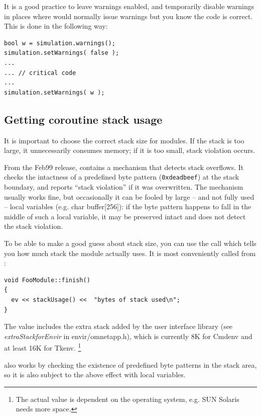 It is a good practice to leave warnings enabled, and
temporarily disable warnings in places where {\opp} would normally
issue warnings but you know the code is correct. This is done in the
following way:

\begin{verbatim}
bool w = simulation.warnings();
simulation.setWarnings( false );
...
... // critical code
...
simulation.setWarnings( w );
\end{verbatim}





\subsection{Getting coroutine stack usage}

It is important to choose the correct stack size for
modules.  If the stack is
too large, it unnecessarily consumes memory; if it is too small, stack
violation occurs.

From the Feb99 release, {\opp} contains a mechanism that detects stack
overflows. It checks the intactness of a
predefined byte pattern (\texttt{0xdeadbeef}) at the stack boundary,
and reports ``stack violation'' if it was
overwritten. The mechanism usually works fine, but occasionally it can
be fooled by large -- and not fully used -- local variables (e.g. char
buffer[256]): if the byte pattern happens to fall in the middle of
such a local variable, it may be preserved intact and {\opp} does not
detect the stack violation.

To be able to make a good guess about stack size, you can use
the  call which tells you how much stack the module
actually uses. It is most conveniently called from :

\begin{verbatim}
void FooModule::finish()
{
  ev << stackUsage() <<  "bytes of stack used\n";
}
\end{verbatim}


The value includes the extra stack added by the user interface library
(see \textit{extraStackforEnvir} in
envir/omnetapp.h), which is currently 8K for Cmdenv and at least 16K
for Tkenv.
  \footnote{The actual value is dependent on the operating
  system, e.g. SUN Solaris needs more space.}

also works by checking the existence of predefined
byte patterns in the stack area, so it is also subject to the above
effect with local variables.


